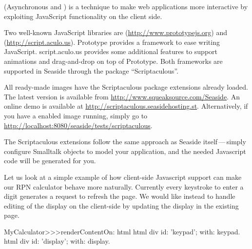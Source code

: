 \documentclass[a4paper,10pt,twoside]{book}
\begin{document}
 (Asynchronous  and ) is a technique to make web applications more interactive by exploiting JavaScript functionality on the client side.

Two well-known JavaScript libraries are  (\url{http://www.prototypejs.org}) and  (\url{http://script.aculo.us}).
Prototype provides a framework to ease writing JavaScript.
script.aculo.us provides some additional features to support animations and drag-and-drop on top of Prototype.
Both frameworks are supported in Seaside through the package ``Scriptaculous''.

All ready-made images have the Scriptaculous package extensions already loaded.
The latest version is available from \url{http://www.squeaksource.com/Seaside}.
An online demo is available at \url{http://scriptaculous.seasidehosting.st}.
Alternatively, if you have a enabled image running, simply go to \url{http://localhost:8080/seaside/tests/scriptaculous}.

The Scriptaculous extensions follow the same approach as Seaside itself\,---\,simply configure Smalltalk objects to model your application, and the needed Javascript code will be generated for you.

Let us look at a simple example of how client-side Javascript support can make our RPN calculator behave more naturally.
Currently every keystroke to enter a digit generates a request to refresh the page.
We would like instead to handle editing of the display on the client-side by updating the display in the existing page.


\begin{code}{}
MyCalculator>>>renderContentOn: html
	html div id: 'keypad'; with: keypad.
	html div id: 'display'; with: display.	
\end{code}

\end{document}
